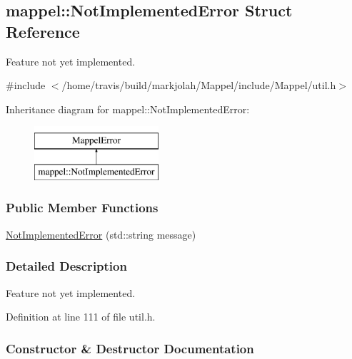 \hypertarget{structmappel_1_1NotImplementedError}{}\subsection{mappel\+:\+:Not\+Implemented\+Error Struct Reference}
\label{structmappel_1_1NotImplementedError}


Feature not yet implemented.  




{\ttfamily \#include $<$/home/travis/build/markjolah/\+Mappel/include/\+Mappel/util.\+h$>$}

Inheritance diagram for mappel\+:\+:Not\+Implemented\+Error\+:\begin{figure}[H]
\begin{center}
\leavevmode
\includegraphics[height=2.000000cm]{structmappel_1_1NotImplementedError}
\end{center}
\end{figure}
\subsubsection*{Public Member Functions}
\begin{DoxyCompactItemize}
\item 
\hyperlink{structmappel_1_1NotImplementedError_a84e2fc0ea1dec71a8968da9563787118}{Not\+Implemented\+Error} (std\+::string message)
\end{DoxyCompactItemize}


\subsubsection{Detailed Description}
Feature not yet implemented. 

Definition at line 111 of file util.\+h.



\subsubsection{Constructor \& Destructor Documentation}
